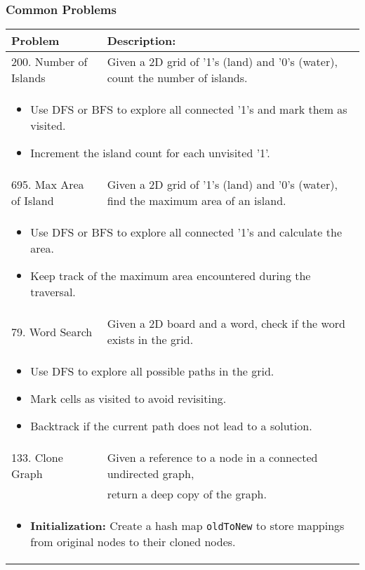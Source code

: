 \subsubsection{Common Problems}
\begin{summary}
    \begin{center}
        \begin{tabular}{ll}
            \toprule
            \textbf{Problem} & \textbf{Description:} \\
            \midrule
            200. Number of Islands & Given a 2D grid of '1's (land) and '0's (water), count the number of islands. \\
            \multicolumn{2}{p{\linewidth}}{
                \begin{itemize}
                    \item Use DFS or BFS to explore all connected '1's and mark them as visited.
                    \item Increment the island count for each unvisited '1'.
                \end{itemize}
            } \\
            \midrule
            695. Max Area of Island & Given a 2D grid of '1's (land) and '0's (water), find the maximum area of an island. \\
            \multicolumn{2}{p{\linewidth}}{
                \begin{itemize}
                    \item Use DFS or BFS to explore all connected '1's and calculate the area.
                    \item Keep track of the maximum area encountered during the traversal.
                \end{itemize}
            } \\
            \midrule
            79. Word Search & Given a 2D board and a word, check if the word exists in the grid. \\
            \multicolumn{2}{p{\linewidth}}{
                \begin{itemize}
                    \item Use DFS to explore all possible paths in the grid.
                    \item Mark cells as visited to avoid revisiting.
                    \item Backtrack if the current path does not lead to a solution.
                \end{itemize}
            } \\
            \midrule
            133. Clone Graph & Given a reference to a node in a connected undirected graph, \\
            & return a deep copy of the graph. \\
            \multicolumn{2}{p{\linewidth}}{
                \begin{itemize}
                    \item \textbf{Initialization:} Create a hash map \texttt{oldToNew} to store mappings from original nodes to their cloned nodes.
                

\end{itemize}}
\end{tabular}
\end{center}
\end{summary}
